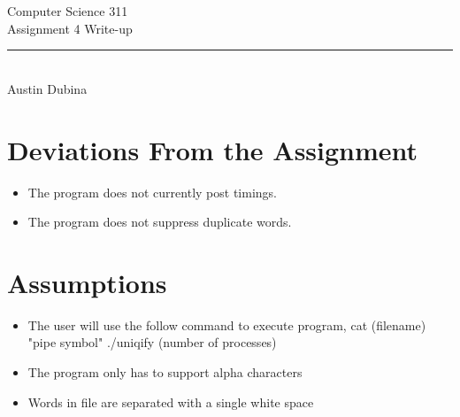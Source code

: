 \documentclass[12pt,letterpaper]{article}
\begin{document}
\begin{titlepage}
    \vspace*{4cm}
    \begin{flushleft}
    {\huge
        Computer Science 311\\[.5cm]
    }
    {\large
        Assignment 4 Write-up
    }
    \end{flushleft}
    \vfill
    \rule{5in}{.5mm}\\
    Austin Dubina

\end{titlepage}

\section{Deviations From the Assignment}
\begin{itemize}
\item The program does not currently post timings.

\item The program does not suppress duplicate words.

\end{itemize}

\section{Assumptions}
\begin{itemize}
\item The user will use the follow command to execute program, cat (filename) "pipe symbol" ./uniqify (number of processes)

\item The program only has to support alpha characters

\item Words in file are separated with a single white space

\end{itemize}
\end{document}
